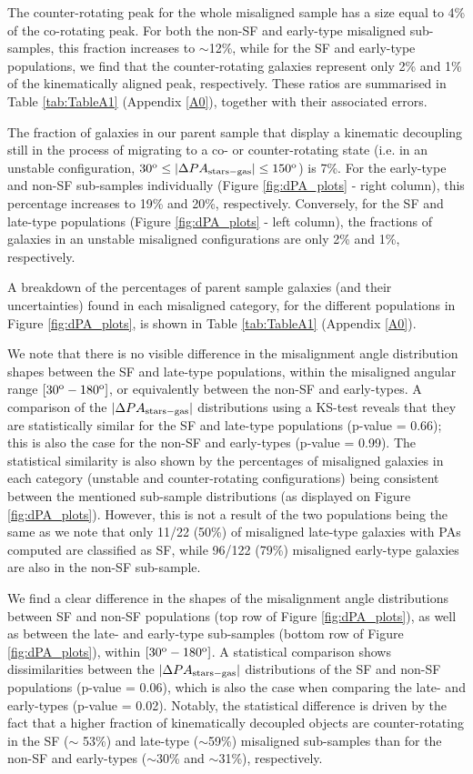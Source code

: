 \documentclass[fleqn,usenatbib]{mnras}
\begin{document}
The counter-rotating peak for the whole misaligned sample has a size equal to 4\% of the co-rotating peak. For both the non-SF and early-type misaligned sub-samples, this fraction increases to $\sim$12\%, while for the SF and early-type populations, we find that the counter-rotating galaxies represent only 2\% and 1\% of the kinematically aligned peak, respectively. These ratios are summarised in Table \ref{tab:TableA1} (Appendix \ref{A0}), together with their associated errors.

The fraction of galaxies in our parent sample that display a kinematic decoupling still in the process of migrating to a co- or counter-rotating state (i.e. in an unstable configuration, $30^{\rm{o}}\leq |\Delta PA_{\rm{stars-gas}}|\leq 150^{\rm{o}} $) is 7\%. For the early-type and non-SF sub-samples individually (Figure \ref{fig:dPA_plots} - right column), this percentage increases to 19\% and 20\%, respectively. Conversely, for the SF and late-type populations (Figure \ref{fig:dPA_plots} - left column), the fractions of galaxies in an unstable misaligned configurations are only 2\% and 1\%, respectively. 

A breakdown of the percentages of parent sample galaxies (and their uncertainties) found in each misaligned category, for the different populations in Figure \ref{fig:dPA_plots}, is shown in Table \ref{tab:TableA1} (Appendix \ref{A0}).

We note that there is no visible difference in the misalignment angle distribution shapes between the SF and late-type populations, within the misaligned angular range $[30^{\rm{o}}-180^{\rm{o}}]$, or equivalently between the non-SF and early-types. A comparison of the $|\Delta PA_{\rm{stars-gas}}|$ distributions using a KS-test reveals that they are statistically similar for the SF and late-type populations (p-value = 0.66); this is also the case for the non-SF and early-types (p-value = 0.99). The statistical similarity is also shown by the percentages of misaligned galaxies in each category (unstable and counter-rotating configurations) being consistent between the mentioned sub-sample distributions (as displayed on Figure \ref{fig:dPA_plots}). However, this is not a result of the two populations being the same as we note that only 11/22 (50\%) of misaligned late-type galaxies with PAs computed are classified as SF, while 96/122 (79\%) misaligned early-type galaxies are also in the non-SF sub-sample.

We find a clear difference in the shapes of the misalignment angle distributions between SF and non-SF populations (top row of Figure \ref{fig:dPA_plots}), as well as between the late- and early-type sub-samples (bottom row of Figure \ref{fig:dPA_plots}), within $[30^{\rm{o}}-180^{\rm{o}}]$. A statistical comparison shows dissimilarities between the $|\Delta PA_{\rm{stars-gas}}|$ distributions of the SF and non-SF populations (p-value = 0.06), which is also the case when comparing the late- and early-types (p-value = 0.02). Notably, the statistical difference is driven by the fact that a higher fraction of kinematically decoupled objects are counter-rotating in the SF ($ \sim$ 53\%) and late-type ($\sim$59\%) misaligned sub-samples than for the non-SF and early-types ($\sim$30\% and $\sim $31\%), respectively.
\end{document}
